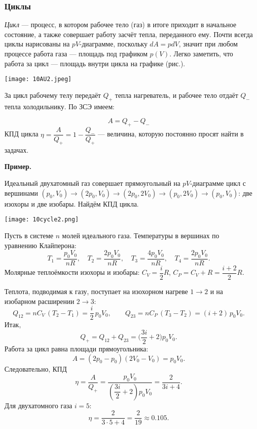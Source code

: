 \documentclass[12pt, a4paper]{article}%
\begin{document}
\subsubsection*{Циклы}

\textit{Цикл} --- процесс, в котором рабочее тело (газ) в итоге приходит в начальное состояние, а также совершает работу засчёт тепла, переданного ему. Почти всегда циклы нарисованы на $pV$-диаграмме, поскольку $dA = pdV$, значит при любом процессе работа газа --- площадь под графиком $p(V)$. Легко заметить, что работа за цикл --- площадь внутри цикла на графике (рис.).

\begin{center}
\texttt{[image: 10AU2.jpeg]}
\label{fig:mpr}
\end{center}

За цикл рабочему телу передаёт $Q_+$ тепла нагреватель, и рабочее тело отдаёт $Q_-$ тепла холодильнику. По ЗСЭ имеем:

\[
A = Q_+-Q_-
\]
КПД цикла $\eta = \dfrac{A}{Q_+} = 1 - \dfrac{Q_-}{Q_+}$ --- величина, которую постоянно просят найти в задачах.

\textbf{Пример.}


Идеальный двухатомный газ совершает прямоугольный на $pV$-диаграмме цикл с вершинами
$(p_0,V_0)\to(2p_0,V_0)\to(2p_0,2V_0)\to(p_0,2V_0)\to(p_0,V_0)$:
две изохоры и две изобары. Найдём КПД цикла.

\begin{center}
\texttt{[image: 10cycle2.png]}
\label{fig:mpr}
\end{center}


Пусть в системе $n$ молей идеального газа. Температуры в вершинах по уравнению Клайперона:
\[
T_1=\frac{p_0V_0}{nR},\quad
T_2=\frac{2p_0V_0}{nR},\quad
T_3=\frac{4p_0V_0}{nR},\quad
T_4=\frac{2p_0V_0}{nR}.
\]
Молярные теплоёмкости изохоры и изобары: \(C_V=\dfrac{i}{2}R\), \(C_P=C_V+R=\dfrac{i+2}{2}R\).

Теплота, подводимая к газу, поступает на изохорном нагреве $1\to2$ и на изобарном расширении $2\to3$:
\[
Q_{12}=nC_V\,(T_2-T_1)=\frac{i}{2}\,p_0V_0,\qquad
Q_{23}=nC_P\,(T_3-T_2)=(i+2)\,p_0V_0.
\]
Итак,
\[
Q_{+}=Q_{12}+Q_{23}=\Big(\frac{3i}{2}+2\Big)p_0V_0.
\]
Работа за цикл равна площади прямоугольника:
\[
A=(2p_0-p_0)(2V_0-V_0)=p_0V_0.
\]
Следовательно, КПД
\[
\eta=\frac{A}{Q_{+}}
=\frac{p_0V_0}{\left(\dfrac{3i}{2}+2\right)p_0V_0}
=\frac{2}{3i+4}.
\]
Для двухатомного газа $i=5$:
\[
\boxed{\,\eta=\frac{2}{3\cdot5+4}=\frac{2}{19}\approx0.105.\,}
\]
\end{document}
